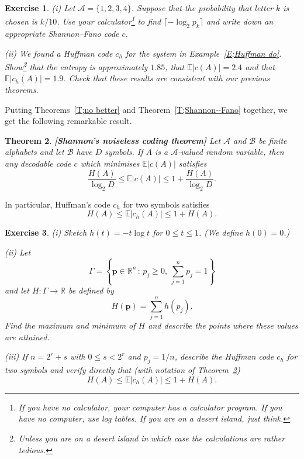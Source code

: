 \documentclass[12pt,a4paper]{article}
\theoremstyle{plain}
\newtheorem{theorem}{Theorem}[section]
\newtheorem{exercise}[theorem]{Exercise}
\theoremstyle{definition}
\begin{document}
    \begin{exercise}
        \label{E;Fano}
        (i) Let ${\mathcal A}=\{1,2,3,4\}$. Suppose that the
        probability
        that letter $k$ is chosen is $k/10$.
        Use your calculator\footnote{If you have no calculator,
        your computer has a calculator program. If you have
        no computer, use log tables. If you are on a desert
        island, just think.} to find $\lceil -\log_{2} p_{k}\rceil$
        and write down an appropriate Shannon--Fano code $c$.

        (ii) We found a Huffman code $c_{h}$ for the system
        in Example~\ref{E;Huffman do}.
        Show\footnote {Unless you are on a desert island
        in which case the calculations are rather tedious.}
        that the entropy is approximately $1.85$,
        that ${\mathbb E}|c(A)|=2.4$
        and that  ${\mathbb E}|c_{h}(A)|=1.9$.
        Check that these results are consistent with
        our previous theorems.
    \end{exercise}
    Putting Theorems~\ref{T;no better} and Theorem~\ref{T;Shannon--Fano}
    together,
    we get the following remarkable result.
    \begin{theorem}
        \label{T;Shannon noiseless}%
        {\bf[Shannon's noiseless coding theorem]}
        Let ${\mathcal A}$ and ${\mathcal B}$
        be finite alphabets and let ${\mathcal B}$ have $D$ symbols. If
        $A$ is a ${\mathcal A}$-valued random variable,
        then any decodable code $c$ which minimises ${\mathbb E}|c(A)|$
        satisfies
        \[\frac{H(A)}{\log_{2} D}\leq
        {\mathbb E}|c(A)|\leq 1+\frac{H(A)}{\log_{2} D}.\]
    \end{theorem}
    In particular, Huffman's code $c_{h}$ for two symbols satisfies
    \[H(A)\leq
    {\mathbb E}|c_{h}(A)|\leq 1+H(A).\]
    \begin{exercise}
        (i) Sketch $h(t)=-t\log t$ for $0\leq t\leq 1$.
        (We define $h(0)=0$.)

        (ii) Let
        \[\Gamma=\left\{{\mathbf p}\in{\mathbb R}^{n}
        \,:\,p_{j}\geq 0,\ \sum_{j=1}^{n}p_{j}=1\right\}\]
        and let $H:\Gamma\rightarrow{\mathbb R}$ be defined by
        \[H({\mathbf p})=\sum_{j=1}^{n}h(p_{j}).\]
        Find the maximum and minimum of $H$ and
        describe the points where these values are attained.

        (iii) If $n=2^{r}+s$ with $0\leq s< 2^{r}$ and $p_{j}=1/n$,
        describe the Huffman code $c_{h}$ for two symbols
        and verify directly that (with notation
        of Theorem~\ref{T;Shannon noiseless})
        \[H(A)\leq
        {\mathbb E}|c_{h}(A)|\leq 1+H(A).\]
    \end{exercise}
\end{document}
